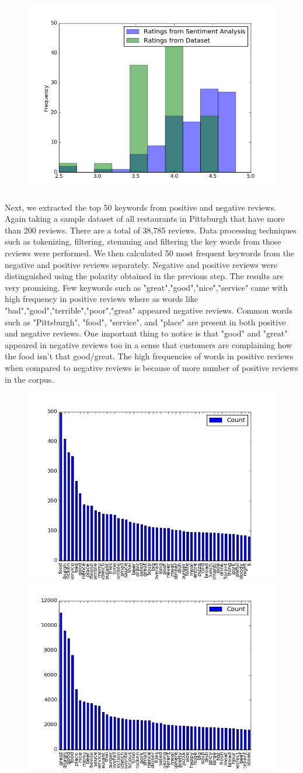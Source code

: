 \documentclass{neu_handout}
\begin{document}
\begin{figure}[h]
\centering
{
\includegraphics[width=0.4\linewidth]{sentimentanalysis}
}
\end{figure}

Next, we extracted the top 50 keywords from positive and negative reviews. Again taking a sample dataset of all restaurants in Pittsburgh that have more than 200 reviews. There are a total of 38,785 reviews. Data processing techniques such as tokenizing, filtering, stemming and filtering the key words from those reviews were performed. We then calculated 50 most frequent keywords from the negative and positive reviews separately. Negative and positive reviews were distinguished using the polarity obtained in the previous step.
The results are very promising. Few keywords such as "great","good","nice","service" came with high frequency in positive reviews where as words like "bad","good","terrible","poor","great" appeared negative reviews. Common words such as "Pittsburgh", "food", "service", and "place" are present in both positive and negative reviews. One important thing to notice is that "good" and "great" appeared in negative reviews too in a sense that customers are complaining how the food isn't that good/great. The high frequencies of words in positive reviews when compared to negative reviews is because of more number of positive reviews in the corpus.

\begin{figure}[h]
\centering
{
\includegraphics[width=0.4\linewidth]{top50_negativereviews}
}
{
\includegraphics[width=0.4\linewidth]{top50_positivereviews}
}
\end{figure}
\end{document}
